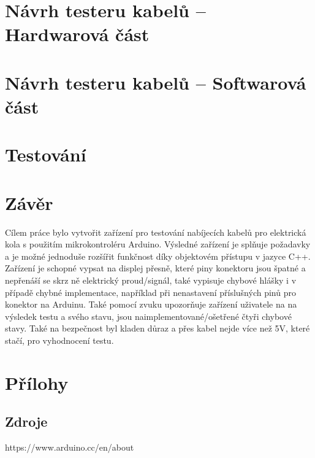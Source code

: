 \documentclass[12pt,a4paper,titlepage]{scrreprt}
\begin{document}
	\chapter{Návrh testeru kabelů – Hardwarová část}
	
	
	\chapter{Návrh testeru kabelů – Softwarová část}
	
	
	
	\chapter{Testování}
	
	
	
	\chapter{Závěr}
	Cílem práce bylo vytvořit zařízení pro testování nabíjecích kabelů pro elektrická kola s použitím mikrokontroléru Arduino. Výsledné zařízení je splňuje požadavky a je možné jednoduše rozšířit funkčnost díky objektovém přístupu v jazyce C++. Zařízení je schopné vypsat na displej přesně, které piny konektoru jsou špatné a nepřenáší se skrz ně elektrický proud/signál, také vypisuje chybové hlášky i v případě chybné implementace, například při nenastavení příslušných pinů pro konektor na Arduinu. Také pomocí zvuku upozorňuje zařízení uživatele na na výsledek testu a svého stavu, jsou naimplementované/ošetřené čtyři chybové stavy. Také na bezpečnost byl kladen důraz a přes kabel nejde více než 5V, které stačí, pro vyhodnocení testu.

	\newpage
	\chapter{Přílohy}
	\section*{Zdroje}
	https://www.arduino.cc/en/about
	
\end{document}
